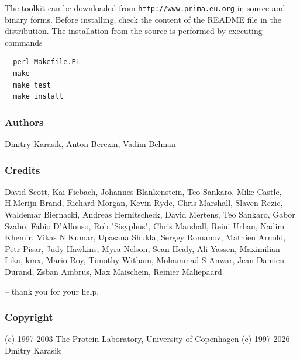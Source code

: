\documentclass{report}
\begin{document}
The toolkit can be downloaded from \texttt{http://www.prima.eu.org} in
source and binary forms. Before installing, check the content of the README file
in the distribution. The installation from the source is performed by
executing commands
\begin{verbatim}
  perl Makefile.PL
  make
  make test
  make install
\end{verbatim}

\subsubsection{Authors}

Dmitry Karasik,
Anton Berezin,
Vadim Belman

\subsubsection{Credits}

David Scott,
Kai Fiebach,
Johannes Blankenstein,
Teo Sankaro,
Mike Castle,
H.Merijn Brand,
Richard Morgan,
Kevin Ryde,
Chris Marshall,
Slaven Rezic,
Waldemar Biernacki,
Andreas Hernitscheck,
David Mertens,
Teo Sankaro,
Gabor Szabo,
Fabio D'Alfonso,
Rob "Sisyphus",
Chris Marshall,
Reini Urban,
Nadim Khemir,
Vikas N Kumar,
Upasana Shukla,
Sergey Romanov,
Mathieu Arnold,
Petr Pisar,
Judy Hawkins,
Myra Nelson,
Sean Healy,
Ali Yassen,
Maximilian Lika,
kmx,
Mario Roy,
Timothy Witham,
Mohammad S Anwar,
Jean-Damien Durand,
Zsban Ambrus,
Max Maischein,
Reinier Maliepaard

-- thank you for your help.

\subsubsection{Copyright}

(c) 1997-2003 The Protein Laboratory, University of Copenhagen
(c) 1997-2026 Dmitry Karasik
\end{document}
